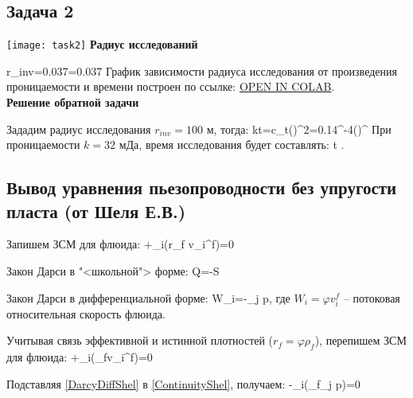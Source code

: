\documentclass[main.tex]{subfiles}
\begin{document}
\subsection{Задача 2}

\texttt{[image: task2]}
\textbf{Радиус исследований}

\beq
r_{inv}=0.037=0.037
\eeq
График зависимости радиуса исследования от произведения проницаемости и времени построен по ссылке: \href{https://colab.research.google.com/github/mualal/notebooks-source/blob/master/7_exploration_radius.ipynb}{OPEN IN COLAB}.
\\

\textbf{Решение обратной задачи}

Зададим радиус исследования $r_{inv}=100\text{ м}$, тогда:
\beq
kt=\varphi\mu c_t\left(\right)^2=0.14^{-4}\cdot \left(\right)^{}\cdot{}
\eeq
При проницаемости $k=32\text{ мДа}$, время исследования будет составлять:
\beq
t\approx{} .
\eeq


\subsection{Вывод уравнения пьезопроводности без упругости пласта (от Шеля Е.В.)}

Запишем ЗСМ для флюида:
\beq
{}+\partial_i\left(r_f v_i^f\right)=0
\eeq

Закон Дарси в "<школьной"> форме:
\beq
Q=-S
\eeq

Закон Дарси в дифференциальной форме:
\beq\label{DarcyDiffShel}
W_i=-\partial_j p,
\eeq
где $W_i=\varphi v_i^f$ -- потоковая относительная скорость флюида.

Учитывая связь эффективной и истинной плотностей ($r_f=\varphi\rho_f$), перепишем ЗСМ для флюида:
\beq\label{ContinuityShel}
+\partial_i\left(\rho_f\varphi v_i^f\right)=0
\eeq

Подставляя \eqref{DarcyDiffShel} в \eqref{ContinuityShel}, получаем:
\beq\label{GeneralPiezo}
-\partial_i\left(\rho_f\partial_j p\right)=0
\eeq
\end{document}
